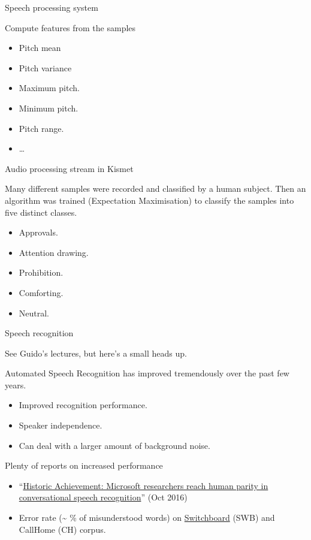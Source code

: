 \documentclass[compress]{beamer}
\providecommand{\tightlist}{%
  \setlength{\itemsep}{0pt}\setlength{\parskip}{0pt}}
\begin{document}
\begin{frame}{Speech processing system}

Compute features from the samples

\begin{itemize}
\tightlist
\item
  Pitch mean
\item
  Pitch variance
\item
  Maximum pitch.
\item
  Minimum pitch.
\item
  Pitch range.
\item
  \ldots{}
\end{itemize}

\end{frame}

\begin{frame}{Audio processing stream in Kismet}

Many different samples were recorded and classified by a human subject.
Then an algorithm was trained (Expectation Maximisation) to classify the
samples into five distinct classes.

\begin{itemize}
\tightlist
\item
  Approvals.
\item
  Attention drawing.
\item
  Prohibition.
\item
  Comforting.
\item
  Neutral.
\end{itemize}

\end{frame}

\begin{frame}{Speech recognition}

See Guido's lectures, but here's a small heads up.

Automated Speech Recognition has improved tremendously over the past few
years.

\begin{itemize}
\tightlist
\item
  Improved recognition performance.
\item
  Speaker independence.
\item
  Can deal with a larger amount of background noise.
\end{itemize}

Plenty of reports on increased performance

\begin{itemize}
\tightlist
\item
  ``\href{https://blogs.microsoft.com/next/2016/10/18/historic-achievement-microsoft-researchers-reach-human-parity-conversational-speech-recognition/\#g5qKXHrZZ2pbxuPH.99}{Historic
  Achievement: Microsoft researchers reach human parity in
  conversational speech recognition}'' (Oct 2016)
\item
  Error rate (\textasciitilde{} \% of misunderstood words) on
  \href{https://catalog.ldc.upenn.edu/LDC2004S13}{Switchboard} (SWB) and
  CallHome (CH) corpus.
\end{itemize}

\end{frame}
\end{document}
